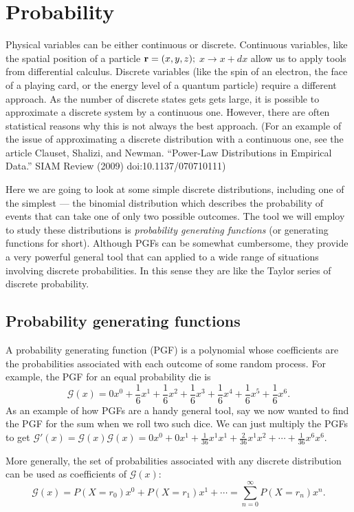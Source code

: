 \documentclass{article}
\newcommand{\calG}{\mathcal{G}}
\begin{document}
\section*{Probability}
Physical variables can be either continuous or discrete. Continuous variables, like the spatial position of a particle ${\bf r} = (x,y,z);$ $x\rightarrow x+dx$ allow us to apply tools from differential calculus. Discrete variables (like the spin of an electron, the face of a playing card, or the energy level of a quantum particle) require a different approach. As the number of discrete states gets gets large, it is possible to approximate a discrete system by a continuous one. However, there are often statistical reasons why this is not always the best approach. (For an example of the issue of approximating a discrete distribution with a continuous one, see the article  Clauset, Shalizi, and Newman. ``Power-Law Distributions in Empirical Data.'' SIAM Review (2009) doi:10.1137/070710111)

Here we are going to look at some simple discrete distributions, including one of the simplest --- the binomial distribution which describes the probability of events that can take one of only two possible outcomes. The tool we will employ to study these distributions is \emph{probability generating functions} (or generating functions for short). Although PGFs can be somewhat cumbersome, they provide a very powerful general tool that can applied to a wide range of situations involving discrete probabilities. In this sense they are like the Taylor series of discrete probability.

\subsection*{Probability generating functions}
A probability generating function (PGF) is a polynomial whose coefficients are the probabilities associated with each outcome of some random process.
For example, the PGF for an equal probability die is 
$$\calG(x) = 0x^0+\frac16x^1+\frac16x^2+\frac16x^3+\frac16x^4+\frac16x^5+\frac16x^6.$$
As an example of how PGFs are a handy general tool, say we now wanted to find the PGF for the sum when we roll two such dice. We can just multiply the PGFs to get $\calG'(x) = \calG(x)\calG(x) = 0x^0 + 0x^1+\frac{1}{36}x^1x^1+\frac{2}{36}x^1x^2+\cdots+\frac{1}{36}x^6x^6.$

More generally, the set of probabilities associated with any discrete distribution can be used as coefficients of $\calG(x)$:
$$\calG(x) = P(X=r_0)x^0+P(X=r_1)x^1+\cdots = \sum_{n=0}^\infty P(X=r_n)x^n.$$
\end{document}

